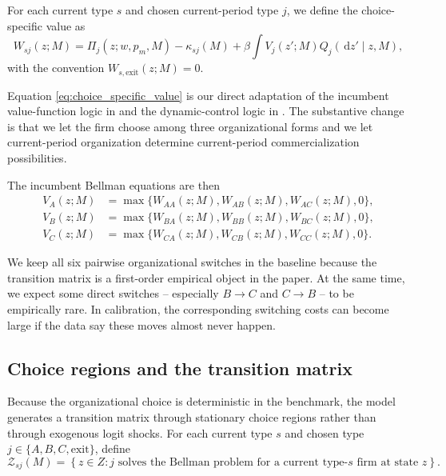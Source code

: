 \documentclass[12pt]{article}
\newcommand{\1}{\mathbf{1}}
\newcommand{\dd}{\,\mathrm{d}}
\begin{document}
For each current type $s$ and chosen current-period type $j$, we define the choice-specific value as
\begin{equation}
W_{sj}(z;M)=\Pi_j(z;w,p_m,M)-\kappa_{sj}(M)+\beta\int V_j(z';M)Q_j(\dd z'\mid z,M),
\label{eq:choice_specific_value}
\end{equation}
with the convention $W_{s,\text{exit}}(z;M)=0$.

Equation \eqref{eq:choice_specific_value} is our direct adaptation of the incumbent value-function logic in \citet{Hopenhayn1992} and the dynamic-control logic in \citet{EricsonPakes1995}. The substantive change is that we let the firm choose among three organizational forms and we let current-period organization determine current-period commercialization possibilities.

The incumbent Bellman equations are then
\begin{align}
V_A(z;M) &= \max\bigl\{W_{AA}(z;M),W_{AB}(z;M),W_{AC}(z;M),0\bigr\}, \label{eq:VA}\\
V_B(z;M) &= \max\bigl\{W_{BA}(z;M),W_{BB}(z;M),W_{BC}(z;M),0\bigr\}, \label{eq:VB}\\
V_C(z;M) &= \max\bigl\{W_{CA}(z;M),W_{CB}(z;M),W_{CC}(z;M),0\bigr\}. \label{eq:VC}
\end{align}

We keep all six pairwise organizational switches in the baseline because the transition matrix is a first-order empirical object in the paper. At the same time, we expect some direct switches -- especially $B\rightarrow C$ and $C\rightarrow B$ -- to be empirically rare. In calibration, the corresponding switching costs can become large if the data say these moves almost never happen.

\subsection{Choice regions and the transition matrix}

Because the organizational choice is deterministic in the benchmark, the model generates a transition matrix through stationary choice regions rather than through exogenous logit shocks. For each current type $s$ and chosen type $j\in\{A,B,C,\text{exit}\}$, define
\begin{equation}
\mathcal Z_{sj}(M)=\left\{z\in Z: j \text{ solves the Bellman problem for a current type-}s\text{ firm at state } z\right\}.
\label{eq:choice_region}
\end{equation}
\end{document}
